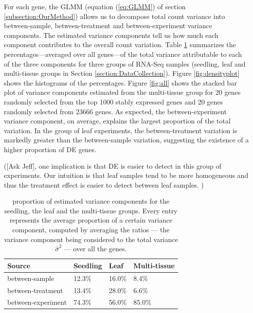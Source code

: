 \documentclass[letterpaper,12pt]{article}
\begin{document}
For each gene, the GLMM (equation (\ref{eq:GLMM}) of section
\ref{subsection:OurMethod}) allows us to decompose total count variance into
between-sample, between-treatment and between-experiment variance components.
The estimated variance components tell us how much each component contributes
to the overall count variation. Table \ref{table:percentageofvariation}
summarizes the percentages---averaged over all genes---of the total variance
attributable to each of the three components for three groups of RNA-Seq
samples (seedling, leaf and multi-tissue groups in Section \ref{section:DataCollection}). Figure \ref{fig:densityplot}
shows the histograms of the percentages. 
Figure \ref{fig:all} shows the stacked bar plot of variance components 
estimated from the multi-tissue group for 20
genes randomly selected from the top 1000 stably expressed genes 
and 20 genes randomly selected from 23666 genes. 
As expected, the between-experiment variance component, on average, explains
the largest proportion of the total variation. In the group of leaf
experiments, the between-treatment variation is markedly greater than the
between-sample variation, suggesting the existence of a higher proportion of DE genes.

([Ask Jeff], one implication is that DE is easier to detect in
this group of experiments.  
 Our intuition is that leaf samples tend
to be more homogeneous and thus the treatment effect is easier to detect
between leaf samples. ) 
 
 \begin{center} \begin{table}[h!] \centering \caption{proportion of estimated
     variance components for the seedling, the leaf and the multi-tissue groups. Every entry represents the average proportion of a certain variance component, computed by averaging the ratios --- the variance component being considered to the total variance $\hat{\sigma}^2$ --- over all the genes.} \label{table:percentageofvariation}
     \begin{tabular}{lp{3cm}p{2.5cm}p{3cm}}\hline
     Source & Seedling & Leaf & Multi-tissue \\  \hline
	 between-sample     & 12.3\%   & 16.0\% & 8.4\%           \\
	 between-treatment  & 13.4\%   & 28.0\% & 6.6\%           \\
	 between-experiment & 74.3\%   & 56.0\% & 85.0\%         \\ \hline
     \end{tabular} \end{table} \end{center}
\end{document}
